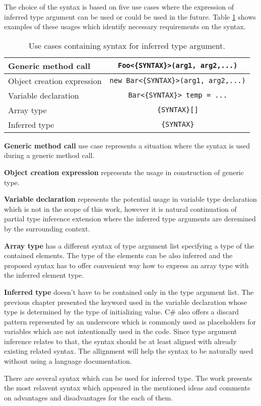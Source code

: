 The choice of the syntax is based on five use cases where the expression of inferred type argument can be used or could be used in the future.
Table \ref{table2:useCasesChar} shows examples of these usages which identify necessary requirements on the syntax.
\begin{table}[h]
\begin{center}
\begin{tabular}{ | l | c | } 
  \hline
  Generic method call & \texttt{Foo<\{SYNTAX\}>(arg1, arg2,...)}\\
  \hline
  Object creation expression & \texttt{new Bar<\{SYNTAX\}>(arg1, arg2,...)}\\
  \hline
  Variable declaration & \texttt{Bar<\{SYNTAX\}> temp = ...}\\
  \hline
  Array type & \texttt{\{SYNTAX\}[]}\\
  \hline
  Inferred type & \texttt{\{SYNTAX\}}\\
  \hline
\end{tabular}
\end{center}
\caption{Use cases containing syntax for inferred type argument.}
\label{table2:useCasesChar}
\end{table}
\par
\textbf{Generic method call} use case represents a situation where the syntax is used during a generic method call.
\par
\textbf{Object creation expression} represents the usage in construction of generic type.
\par
\textbf{Variable declaration} represents the potential usage in variable type declaration which is not in the scope of this work, however it is natural continuation of partial type inference extension where the inferred type arguments are deremined by the surrounding context.
\par
\textbf{Array type} has a different syntax of type argument list specifying a type of the contained elements.
The type of the elements can be also inferred and the proposed syntax has to offer convenient way how to express an array type with the inferred element type.
\par
\textbf{Inferred type} doesn't have to be contained only in the type argument list.
The previous chapter presented the  keyword used in the variable declaration whose type is determined by the type of initializing value.
C\# also offers a discard pattern \cite{online:discard} represented by an underscore which is commonly used as placeholders for variables which are not intentionally used in the code.  
Since type argument inference relates to that, the syntax should be at least aligned with already existing related syntax.
The allignment will help the syntax to be naturally used without using a language documentation.
\par
There are several syntax which can be used for inferred type.
The work presents the most relavent syntax which appeared in the mentioned ideas and comments on advantages and disadvantages for the each of them.

